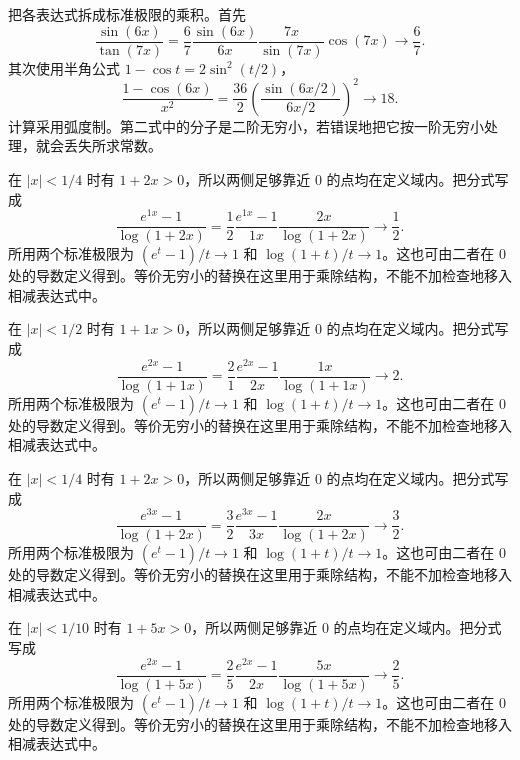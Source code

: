 \documentclass[12pt,fontset=fandol]{ctexart}
\begin{document}
\begin{solve}\label{ans:c3q13}
把各表达式拆成标准极限的乘积。首先
\[
\frac{\sin(6x)}{\tan(7x)}=\frac{6}{7}\frac{\sin(6x)}{6x}\frac{7x}{\sin(7x)}\cos(7x)\longrightarrow \frac{6}{7}.
\]
其次使用半角公式 $1-\cos t=2\sin^2(t/2)$，
\[
\frac{1-\cos(6x)}{x^2}=\frac{36}2\left(\frac{\sin(6x/2)}{6x/2}\right)^2\longrightarrow 18.
\]
计算采用弧度制。第二式中的分子是二阶无穷小，若错误地把它按一阶无穷小处理，就会丢失所求常数。
\end{solve}

\begin{solve}\label{ans:c3q14}
在 $|x|<1/4$ 时有 $1+2x>0$，所以两侧足够靠近 $0$ 的点均在定义域内。把分式写成
\[
\frac{e^{1x}-1}{\log(1+2x)}=\frac{1}{2}\frac{e^{1x}-1}{1x}\frac{2x}{\log(1+2x)}\longrightarrow \frac{1}{2}.
\]
所用两个标准极限为 $(e^t-1)/t\to1$ 和 $\log(1+t)/t\to1$。这也可由二者在 $0$ 处的导数定义得到。等价无穷小的替换在这里用于乘除结构，不能不加检查地移入相减表达式中。
\end{solve}

\begin{solve}\label{ans:c3q15}
在 $|x|<1/2$ 时有 $1+1x>0$，所以两侧足够靠近 $0$ 的点均在定义域内。把分式写成
\[
\frac{e^{2x}-1}{\log(1+1x)}=\frac{2}{1}\frac{e^{2x}-1}{2x}\frac{1x}{\log(1+1x)}\longrightarrow 2.
\]
所用两个标准极限为 $(e^t-1)/t\to1$ 和 $\log(1+t)/t\to1$。这也可由二者在 $0$ 处的导数定义得到。等价无穷小的替换在这里用于乘除结构，不能不加检查地移入相减表达式中。
\end{solve}

\begin{solve}\label{ans:c3q16}
在 $|x|<1/4$ 时有 $1+2x>0$，所以两侧足够靠近 $0$ 的点均在定义域内。把分式写成
\[
\frac{e^{3x}-1}{\log(1+2x)}=\frac{3}{2}\frac{e^{3x}-1}{3x}\frac{2x}{\log(1+2x)}\longrightarrow \frac{3}{2}.
\]
所用两个标准极限为 $(e^t-1)/t\to1$ 和 $\log(1+t)/t\to1$。这也可由二者在 $0$ 处的导数定义得到。等价无穷小的替换在这里用于乘除结构，不能不加检查地移入相减表达式中。
\end{solve}

\begin{solve}\label{ans:c3q17}
在 $|x|<1/10$ 时有 $1+5x>0$，所以两侧足够靠近 $0$ 的点均在定义域内。把分式写成
\[
\frac{e^{2x}-1}{\log(1+5x)}=\frac{2}{5}\frac{e^{2x}-1}{2x}\frac{5x}{\log(1+5x)}\longrightarrow \frac{2}{5}.
\]
所用两个标准极限为 $(e^t-1)/t\to1$ 和 $\log(1+t)/t\to1$。这也可由二者在 $0$ 处的导数定义得到。等价无穷小的替换在这里用于乘除结构，不能不加检查地移入相减表达式中。
\end{solve}
\end{document}
